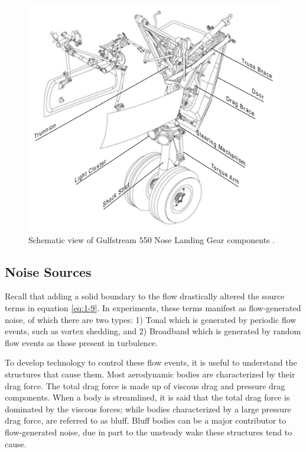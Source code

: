 \begin{figure}
	\begin{center}
		\centerline{\includegraphics[scale=0.5]{figures/lg_schematic.pdf}}
		\caption{Schematic view of Gulfstream 550 Nose Landing Gear components \cite{g550uom}.}
		\label{fig:lg2}
	\end{center}
\end{figure}


\subsection{Noise Sources}
Recall that adding a solid boundary to the flow drastically altered the source terms in equation \ref{eq:1-9}. In experiments, these terms manifest as flow-generated noise, of which there are two types: 1) Tonal which is generated by periodic flow events, such as vortex shedding, and 2) Broadband which is generated by random flow events as those present in turbulence. 

To develop technology to control these flow events, it is useful to understand the structures that cause them. Most aerodynamic bodies are characterized by their drag force. The total drag force is made up of viscous drag and pressure drag components. When a body is streamlined, it is said that the total drag force is dominated by the viscous forces; while bodies characterized by a large pressure drag force, are referred to as bluff. Bluff bodies can be a major contributor to flow-generated noise, due in part to the unsteady wake these structures tend to cause. 

